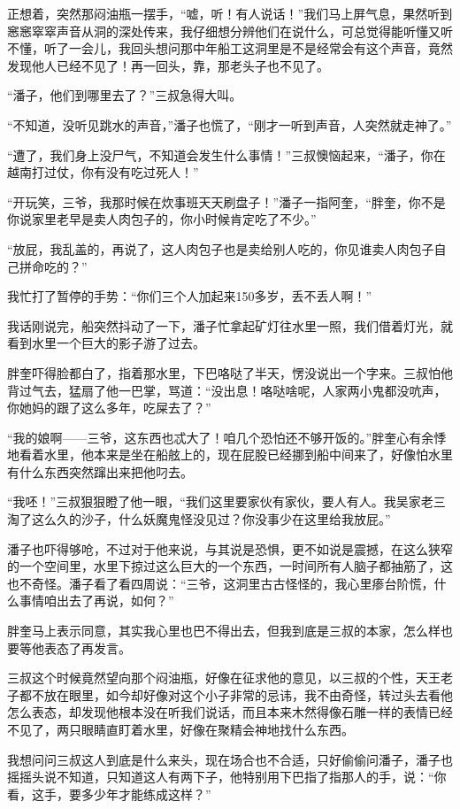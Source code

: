 正想着，突然那闷油瓶一摆手，“嘘，听！有人说话！”我们马上屏气息，果然听到窸窸窣窣声音从洞的深处传来，我仔细想分辨他们在说什么，可总觉得能听懂又听不懂，听了一会儿，我回头想问那中年船工这洞里是不是经常会有这个声音，竟然发现他人已经不见了！再一回头，靠，那老头子也不见了。

“潘子，他们到哪里去了？”三叔急得大叫。

“不知道，没听见跳水的声音，”潘子也慌了，“刚才一听到声音，人突然就走神了。”

“遭了，我们身上没尸气，不知道会发生什么事情！”三叔懊恼起来，“潘子，你在越南打过仗，你有没有吃过死人！”

“开玩笑，三爷，我那时候在炊事班天天刷盘子！”潘子一指阿奎，“胖奎，你不是你说家里老早是卖人肉包子的，你小时候肯定吃了不少。”

“放屁，我乱盖的，再说了，这人肉包子也是卖给别人吃的，你见谁卖人肉包子自己拼命吃的？”

我忙打了暂停的手势：“你们三个人加起来150多岁，丢不丢人啊！”

我话刚说完，船突然抖动了一下，潘子忙拿起矿灯往水里一照，我们借着灯光，就看到水里一个巨大的影子游了过去。

胖奎吓得脸都白了，指着那水里，下巴咯哒了半天，愣没说出一个字来。三叔怕他背过气去，猛扇了他一巴掌，骂道：“没出息！咯哒啥呢，人家两小鬼都没吭声，你她妈的跟了这么多年，吃屎去了？”

“我的娘啊——三爷，这东西也忒大了！咱几个恐怕还不够开饭的。”胖奎心有余悸地看着水里，他本来是坐在船舷上的，现在屁股已经挪到船中间来了，好像怕水里有什么东西突然蹿出来把他叼去。

“我呸！”三叔狠狠瞪了他一眼，“我们这里要家伙有家伙，要人有人。我吴家老三淘了这么久的沙子，什么妖魔鬼怪没见过？你没事少在这里给我放屁。”

潘子也吓得够呛，不过对于他来说，与其说是恐惧，更不如说是震撼，在这么狭窄的一个空间里，水里下掠过这么巨大的一个东西，一时间所有人脑子都抽筋了，这也不奇怪。潘子看了看四周说：“三爷，这洞里古古怪怪的，我心里瘆台阶慌，什么事情咱出去了再说，如何？”

胖奎马上表示同意，其实我心里也巴不得出去，但我到底是三叔的本家，怎么样也要等他表态了再发言。

三叔这个时候竟然望向那个闷油瓶，好像在征求他的意见，以三叔的个性，天王老子都不放在眼里，如今却好像对这个小子非常的忌讳，我不由奇怪，转过头去看他怎么表态，却发现他根本没在听我们说话，而且本来木然得像石雕一样的表情已经不见了，两只眼睛直盯着水里，好像在聚精会神地找什么东西。

我想问问三叔这人到底是什么来头，现在场合也不合适，只好偷偷问潘子，潘子也摇摇头说不知道，只知道这人有两下子，他特别用下巴指了指那人的手，说：“你看，这手，要多少年才能练成这样？”

